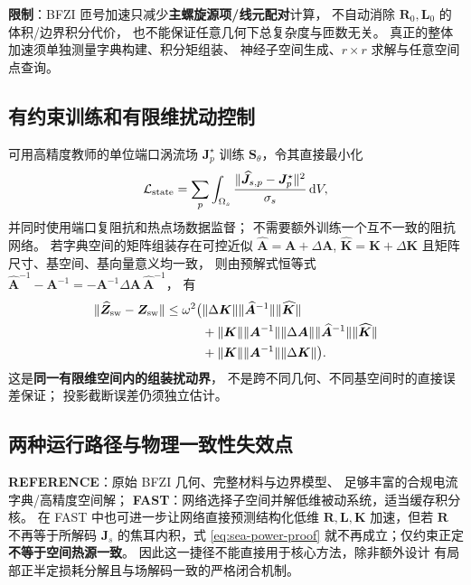 \textbf{限制}：BFZI 匝号加速只减少\textbf{主螺旋源项/线元配对}计算，
不自动消除 \(\bm R_0,\bm L_0\) 的体积/边界积分代价，
也不能保证任意几何下总复杂度与匝数无关。
真正的整体加速须单独测量字典构建、积分矩组装、
神经子空间生成、\(r\times r\) 求解与任意空间点查询。

\subsection{有约束训练和有限维扰动控制}
可用高精度教师的单位端口涡流场 \(\bm J_p^\star\)
训练 \(\bm S_\theta\)，令其直接最小化
\[
\mathcal L_{\rm state}
=\sum_p\int_{\Omega_s}
\frac{\|\widehat{\bm J}_{s,p}-\bm J_p^\star\|^2}
{\sigma_s}\,\mathrm dV,
\]
并同时使用端口复阻抗和热点场数据监督；
不需要额外训练一个互不一致的阻抗网络。
若字典空间的矩阵组装存在可控近似
\(\widehat{\bm A}=\bm A+\Delta\bm A\),
\(\widehat{\bm K}=\bm K+\Delta\bm K\)
且矩阵尺寸、基空间、基向量意义均一致，
则由预解式恒等式
\(\widehat{\bm A}^{-1}-\bm A^{-1}
=-\bm A^{-1}\Delta\bm A\,\widehat{\bm A}^{-1}\)，
有
\begin{align}
\|\widehat{\bm Z}_{\rm sw}-\bm Z_{\rm sw}\|
\leq \omega^2\bigl(&
\|\Delta\bm K\|\|\widehat{\bm A}^{-1}\|\|\widehat{\bm K}\|\nonumber\\
&+\|\bm K\|\|\bm A^{-1}\|\|\Delta\bm A\|
\|\widehat{\bm A}^{-1}\|\|\widehat{\bm K}\|\nonumber\\
&+\|\bm K\|\|\bm A^{-1}\|\|\Delta\bm K\|
\bigr).\label{eq:z-perturbation}
\end{align}
这是\textbf{同一有限维空间内的组装扰动界}，
不是跨不同几何、不同基空间时的直接误差保证；
投影截断误差仍须独立估计。

\subsection{两种运行路径与物理一致性失效点}
\textbf{REFERENCE}：原始 BFZI 几何、完整材料与边界模型、
足够丰富的合规电流字典/高精度空间解；
\textbf{FAST}：网络选择子空间并解低维被动系统，适当缓存积分核。
在 FAST 中也可进一步让网络直接预测结构化低维
\(\bm R,\bm L,\bm K\) 加速，但若 \(\bm R\) 不再等于所解码
\(\bm J_s\) 的焦耳内积，式 \eqref{eq:sea-power-proof}
就不再成立；仅约束正定\textbf{不等于空间热源一致}。
因此这一捷径不能直接用于核心方法，除非额外设计
有局部正半定损耗分解且与场解码一致的严格闭合机制。
